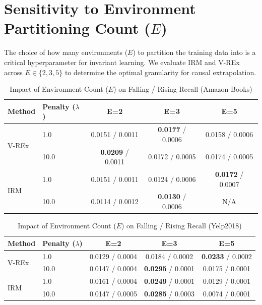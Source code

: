 \documentclass{article}
\begin{document}
\section{Sensitivity to Environment Partitioning Count ($E$)}
The choice of how many environments ($E$) to partition the training data into is a critical hyperparameter for invariant learning. We evaluate IRM and V-REx across $E \in \{2, 3, 5\}$ to determine the optimal granularity for causal extrapolation.

\begin{table}[h]
    \centering
    \caption{Impact of Environment Count ($E$) on Falling / Rising Recall (Amazon-Books)}
    \label{tab:env_amazon}
    \begin{tabular}{llccc}
        \toprule
        \textbf{Method} & \textbf{Penalty ($\lambda$)} & \textbf{E=2} & \textbf{E=3} & \textbf{E=5} \\
        \midrule
        \multirow{2}{*}{V-REx}
        & 1.0   & 0.0151 / 0.0011 & \textbf{0.0177} / 0.0006 & 0.0158 / 0.0006 \\
        & 10.0  & \textbf{0.0209} / 0.0011 & 0.0172 / 0.0005 & 0.0174 / 0.0005 \\
        \midrule
        \multirow{2}{*}{IRM}
        & 1.0   & 0.0151 / 0.0011 & 0.0124 / 0.0006 & \textbf{0.0172} / 0.0007 \\
        & 10.0  & 0.0114 / 0.0012 & \textbf{0.0130} / 0.0006 & N/A    \\
        \bottomrule
    \end{tabular}
\end{table}

\begin{table}[h]
    \centering
    \caption{Impact of Environment Count ($E$) on Falling / Rising Recall (Yelp2018)}
    \label{tab:env_yelp}
    \begin{tabular}{llccc}
        \toprule
        \textbf{Method} & \textbf{Penalty ($\lambda$)} & \textbf{E=2} & \textbf{E=3} & \textbf{E=5} \\
        \midrule
        \multirow{2}{*}{V-REx}
        & 1.0   & 0.0129 / 0.0004 & 0.0184 / 0.0002 & \textbf{0.0233} / 0.0002 \\
        & 10.0  & 0.0147 / 0.0004 & \textbf{0.0295} / 0.0001 & 0.0175 / 0.0001 \\
        \midrule
        \multirow{2}{*}{IRM}
        & 1.0   & 0.0161 / 0.0004 & \textbf{0.0249} / 0.0001 & 0.0129 / 0.0001 \\
        & 10.0  & 0.0147 / 0.0005 & \textbf{0.0285} / 0.0003 & 0.0074 / 0.0001 \\
        \bottomrule
    \end{tabular}
\end{table}
\end{document}
